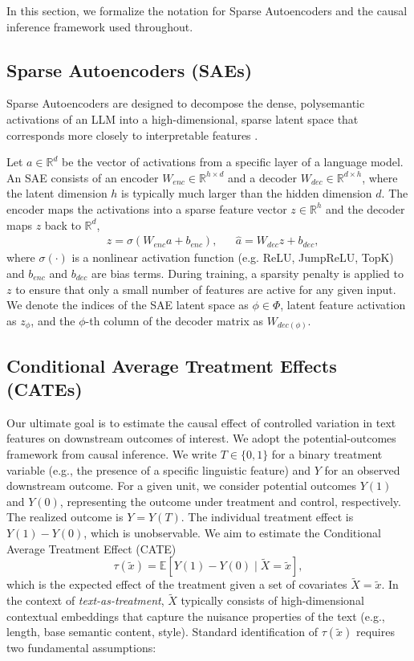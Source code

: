 \documentclass{article}
\theoremstyle{plain}
\theoremstyle{definition}
\theoremstyle{remark}
\begin{document}
In this section, we formalize the notation for Sparse Autoencoders and the causal inference framework used throughout.

\subsection{Sparse Autoencoders (SAEs)}
Sparse Autoencoders are designed to decompose the dense, polysemantic activations of an LLM into a high-dimensional, sparse latent space that corresponds more closely to interpretable features \citep{bricken2023monosemanticity}.

Let $a \in \mathbb{R}^d$ be the vector of activations from a specific layer of a language model. An SAE consists of an encoder $W_{enc} \in \mathbb{R}^{h \times d}$ and a decoder $W_{dec} \in \mathbb{R}^{d \times h}$, where the latent dimension $h$ is typically much larger than the hidden dimension $d$. The encoder maps the activations into a sparse feature vector $z \in \mathbb{R}^h$ and the decoder maps $z$ back to $\mathbb{R}^d$,
\begin{align}
    &z = \sigma(W_{enc}a + b_{enc}), %
    &
    &\hat{a} = W_{dec}z + b_{dec} \label{eq:saedec},
\end{align}
where $\sigma(\cdot)$ is a nonlinear activation function (e.g. ReLU, JumpReLU, TopK) and $b_{enc}$ and $b_{dec}$ are bias terms.
During training, a sparsity penalty is applied to $z$ to ensure that only a small number of features are active for any given input. We denote the indices of the SAE latent space as $\phi \in \Phi$, latent feature activation as $z_\phi$, and the $\phi$-th column of the decoder matrix as $W_{dec(\phi)}$.

\subsection{Conditional Average Treatment Effects (CATEs)}
\label{sec:TE-Intro}

Our ultimate goal is to estimate the causal effect of controlled variation in text features on downstream outcomes of interest.
We adopt the potential-outcomes framework from causal inference.
We write $T \in \{0, 1\}$ for a binary treatment variable (e.g., the presence of a specific linguistic feature) and $Y$ for an observed downstream outcome. For a given unit, we consider potential outcomes $Y(1)$ and $Y(0)$, representing the outcome under treatment and control, respectively.
The realized outcome is $Y = Y(T)$.
The individual treatment effect is $Y(1) - Y(0)$, which is unobservable. We aim to estimate the Conditional Average Treatment Effect (CATE)
\begin{equation}
\label{eqn:CATE}
    \tau(\tilde{x}) = \mathbb{E}[Y(1) - Y(0) \mid \tilde{X} {=} \tilde{x}],
\end{equation}
which is the expected effect of the treatment given a set of covariates $\tilde{X}{=}\tilde{x}$.
In the context of \textit{text-as-treatment}, $\tilde{X}$ typically consists of high-dimensional contextual embeddings that capture the nuisance properties of the text (e.g., length, base semantic content, style). Standard identification of $\tau(\tilde{x})$ requires two fundamental assumptions:
\end{document}
